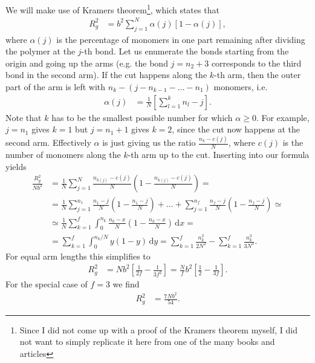 \documentclass[english, parskip=full]{scrartcl}
\newcommand{\intx}{}
\newcommand{\kla}{}
\newcommand{\klam}{}
\begin{document}
We will make use of Kramers theorem\footnote{Since I did not come up with a proof of the Kramers theorem myself, I did not want to simply replicate it here from one of the many books and articles}, which states that
\begin{align}
R_g^2 &= b^2 \sum_{j=1}^N \alpha(j) \klam\left[ 1 - \alpha(j) \right],
\end{align}
where $\alpha(j)$ is the percentage of monomers in one part remaining after dividing the polymer at the $j$-th bond.
Let us enumerate the bonds starting from the origin and going up the arms (e.g. the bond $j=n_2 + 3$ corresponds to the third bond in the second arm).
If the cut happens along the $k$-th arm, then the outer part of the arm is left with $n_k - (j - n_{k-1} - \dots - n_1)$ monomers, i.e. 
\begin{align}
\alpha(j) &= \frac{1}{N} \klam\left[ \sum_{l=1}^k n_l - j \right].
\end{align}
Note that $k$ has to be the smallest possible number for which $\alpha \ge 0$.
For example, $j=n_1$ gives $k=1$ but $j=n_1 + 1$ gives $k=2$, since the cut now happens at the second arm.
Effectively $\alpha$ is just giving us the ratio $\frac{n_k - c(j)}{N}$, where $c(j)$ is the number of monomers along the $k$-th arm up to the cut.
Inserting into our formula yields
\begin{align}
\frac{R_g^2}{Nb^2} &= \frac{1}{N} \sum_{j=1}^N \frac{n_{k(j)} - c(j)}{N} \kla\left( 1 - \frac{n_{k(j)} - c(j)}{N} \right) = \\
&= \frac{1}{N} \sum_{j=1}^{n_1} \frac{n_1 - j}{N} \kla\left( 1 - \frac{n_1 - j}{N} \right) + \dots + \sum_{j=1}^{n_f} \frac{n_f - j}{N} \kla\left( 1 - \frac{n_f - j}{N} \right) \simeq \\
&\simeq \frac{1}{N} \sum_{k=1}^f \intx\int_{0}^{n_k} \frac{n_k - x}{N} \kla\left( 1 - \frac{n_k - x}{N} \right) \, \mathrm{d}x = \\
&= \sum_{k=1}^f \intx\int_{0}^{n_k / N} y (1-y) \, \mathrm{d}y = \sum_{k=1}^f \frac{n_k^2}{2N^2} - \sum_{k=1}^f \frac{n_k^3}{3N^3}.
\end{align}
For equal arm lengths this simplifies to
\begin{align}
R_g^2 &= Nb^2 \klam\left[ \frac{1}{2f} - \frac{1}{3f^2} \right] = \frac{N}{f} b^2 \klam\left[ \frac{1}{2} - \frac{1}{3f} \right].
\end{align}
For the special case of $f=3$ we find
\begin{align}
R_g^2 &= \frac{7Nb^2}{54}.
\end{align}


\end{document}
